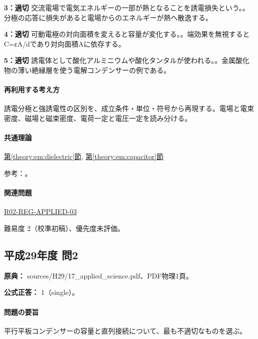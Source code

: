 \noindent\textbf{3：適切} 交流電場で電気エネルギーの一部が熱となることを誘電損失という。。分極の応答に損失があると電場からのエネルギーが熱へ散逸する。\par

\noindent\textbf{4：適切} 可動電極の対向面積を変えると容量が変化する。。端効果を無視するとC=εA/dであり対向面積Aに依存する。\par

\noindent\textbf{5：適切} 誘電体として酸化アルミニウムや酸化タンタルが使われる。。金属酸化物の薄い絶縁層を使う電解コンデンサーの例である。\par

\paragraph{再利用する考え方} 誘電分極と強誘電性の区別を、成立条件・単位・符号から再現する。電場と電束密度、磁場と磁束密度、電荷一定と電圧一定を読み分ける。

\paragraph{共通理論} \hyperref[theory:em:dielectric]{第\ref*{theory:em:dielectric}節}, \hyperref[theory:em:capacitor]{第\ref*{theory:em:capacitor}節}

\par 参考：\cite{mit_em05,mit_ferroelectric}。

\paragraph{関連問題} \hyperref[q:r02-reg-applied-03]{R02-REG-APPLIED-03}

\par 難易度 2（校準初稿）、優先度未評価。

\subsection{平成29年度 問2}
\label{q:h29-reg-applied-02}

\noindent\textbf{原典：} sources/H29/17\_applied\_science.pdf、PDF物理1頁。

\textbf{公式正答：} 1（single）。

\paragraph{問題の要旨} 平行平板コンデンサーの容量と直列接続について、最も不適切なものを選ぶ。

